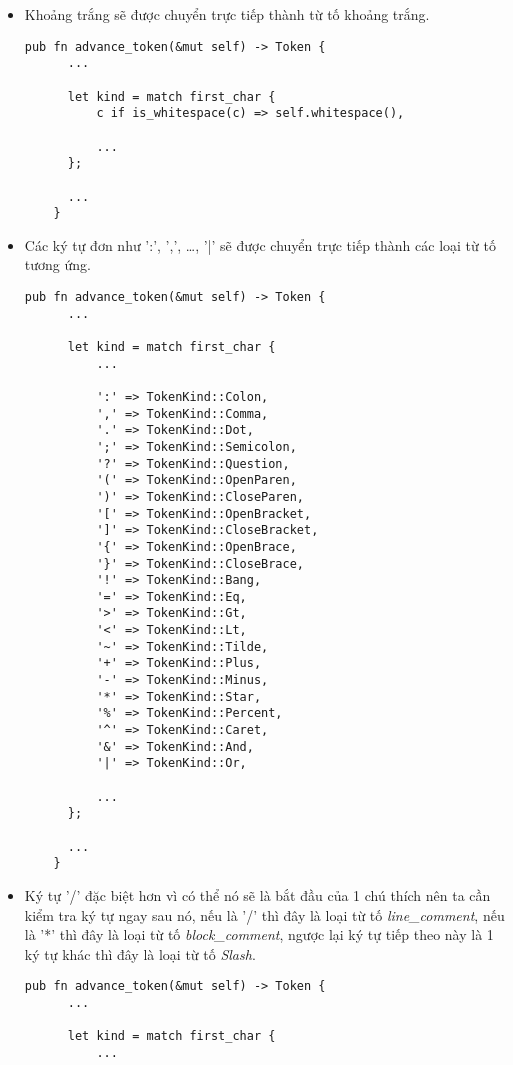 \begin{itemize}
  \item Khoảng trắng sẽ được chuyển trực tiếp thành từ tố khoảng trắng.
  \begin{lstlisting}[]
    pub fn advance_token(&mut self) -> Token {
      ...
  
      let kind = match first_char {
          c if is_whitespace(c) => self.whitespace(),
  
          ...
      };
  
      ...
    } 
  \end{lstlisting}
  \item Các ký tự đơn như ':', ',', \dots , '|' sẽ được chuyển trực tiếp thành các loại từ tố tương ứng.
  \begin{lstlisting}[]
    pub fn advance_token(&mut self) -> Token {
      ...
  
      let kind = match first_char {
          ...
  
          ':' => TokenKind::Colon,
          ',' => TokenKind::Comma,
          '.' => TokenKind::Dot,
          ';' => TokenKind::Semicolon,
          '?' => TokenKind::Question,
          '(' => TokenKind::OpenParen,
          ')' => TokenKind::CloseParen,
          '[' => TokenKind::OpenBracket,
          ']' => TokenKind::CloseBracket,
          '{' => TokenKind::OpenBrace,
          '}' => TokenKind::CloseBrace,
          '!' => TokenKind::Bang,
          '=' => TokenKind::Eq,
          '>' => TokenKind::Gt,
          '<' => TokenKind::Lt,
          '~' => TokenKind::Tilde,
          '+' => TokenKind::Plus,
          '-' => TokenKind::Minus,
          '*' => TokenKind::Star,
          '%' => TokenKind::Percent,
          '^' => TokenKind::Caret,
          '&' => TokenKind::And,
          '|' => TokenKind::Or,
  
          ...
      };
  
      ...
    } 
  \end{lstlisting}
  \item Ký tự '/' đặc biệt hơn vì có thể nó sẽ là bắt đầu của 1 chú thích nên ta cần kiểm tra ký tự ngay sau nó, nếu là '/' thì đây là loại từ tố \textit{line\_comment}, nếu là '*' thì đây là loại từ tố \textit{block\_comment}, ngược lại ký tự tiếp theo này là 1 ký tự khác thì đây là loại từ tố \textit{Slash}.
  \begin{lstlisting}[]
    pub fn advance_token(&mut self) -> Token {
      ...
  
      let kind = match first_char {
          ...
  

\end{lstlisting}
\end{itemize}
